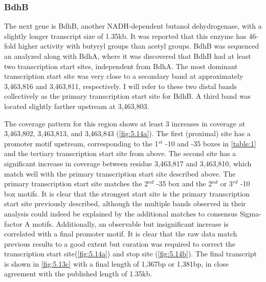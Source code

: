 \subsubsection{BdhB}
The next gene is BdhB, another NADH-dependent butanol dehydrogenase, with a slightly longer transcript size of 1.35kb. It was reported that this enzyme has 46-fold higher activity with butyryl groups than acetyl groups\cite{71,73}. BdhB was sequenced an analyzed along with BdhA, where it was discovered that BdhB had at least two transcription start sites, independent from BdhA. The most dominant transcription start site was very close to a secondary band at approximately 3,463,816 and 3,463,811, respectively\cite{73}. I will refer to these two distal bands collectively as the primary transcription start site for BdhB. A third band was located slightly farther upstream at 3,463,803\cite{73}. 

The coverage pattern for this region shows at least 3 increases in coverage at 3,463,802, 3,463,813, and 3,463,843 (\ref{fig:5.14a}). The first (proximal) site has a promoter motif upstream, corresponding to the 1$^{st}$ -10 and -35 boxes in \ref{table:1} and the tertiary transcription start site from above\cite{72}. The second site has a significant increase in coverage between residue 3,463,817 and 3,463,810, which match well with the primary transcription start site described above\cite{73}. The primary transcription start site matches the 2$^{nd}$  -35 box and the 2$^{nd}$ or 3$^{rd}$ -10 box motifs\cite{73}. It is clear that the strongest start site is the primary transcription start site previously described\cite{73}, although the multiple bands observed in their analysis could indeed be explained by the additional matches to consensus Sigma-factor A motifs. Additionally, an observable but insignificant increase is correlated with a final promoter motif. It is clear that the raw data match previous results to a good extent but curation was required to correct the transcription start site(\ref{fig:5.14a}) and stop site (\ref{fig:5.14b}). The final transcript is shown in \ref{fig:5.13c} with a final length of 1,367bp or 1,381bp, in close agreement with the published length of 1.35kb.

